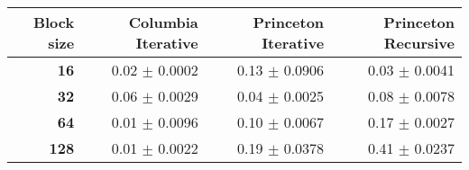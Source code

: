 \begin{tabular}{rrrr}\toprule
\textbf{Block size}  & \textbf{Columbia Iterative} & \textbf{Princeton Iterative} & \textbf{Princeton Recursive}\\\midrule
\textbf{16}  & 0.02 $\pm$ 0.0002 & 0.13 $\pm$ 0.0906 & 0.03 $\pm$ 0.0041\\
\textbf{32}  & 0.06 $\pm$ 0.0029 & 0.04 $\pm$ 0.0025 & 0.08 $\pm$ 0.0078\\
\textbf{64}  & 0.01 $\pm$ 0.0096 & 0.10 $\pm$ 0.0067 & 0.17 $\pm$ 0.0027\\
\textbf{128} & 0.01 $\pm$ 0.0022 & 0.19 $\pm$ 0.0378 & 0.41 $\pm$ 0.0237\\
\bottomrule
\end{tabular}
